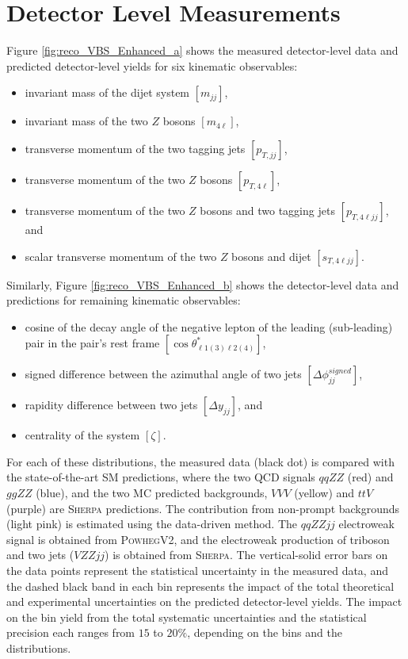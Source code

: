 \section{Detector Level Measurements }
\label{sec:DetectorLevel_Measurement}

Figure \ref{fig:reco_VBS_Enhanced_a} shows the measured detector-level data and predicted detector-level yields for six kinematic observables:
\begin{itemize}
    \item{ invariant mass of the dijet system $[m_{jj}]$},
    \item{ invariant mass of the two $Z$ bosons $[m_{4\ell}]$},
    \item{ transverse momentum of the two tagging jets $[p_{T,jj}]$},
    \item{ transverse momentum of the two $Z$ bosons $[p_{T,4\ell}]$},
    \item{ transverse momentum of the two $Z$ bosons and two tagging jets $[p_{T,4\ell jj}]$}, and 
    \item{ scalar transverse momentum of the two $Z$ bosons and dijet $[s_{T,4\ell jj}]$}.
\end{itemize}
Similarly, Figure \ref{fig:reco_VBS_Enhanced_b} shows the detector-level data and predictions for remaining kinematic observables:
\begin{itemize}
\item{ cosine of the decay angle of the negative lepton of the leading (sub-leading) pair in the pair's rest frame $[\cos \theta^{*}_{\ell 1 (3) \ell 2 (4)}]$},
\item{ signed difference between the azimuthal angle of two jets $[\Delta \phi _{jj}^{signed}]$},
\item{ rapidity difference between two jets $[\Delta y_{jj}]$}, and 
\item{ centrality of the system $[\zeta]$}.
\end{itemize}
For each of these distributions, the measured data (black dot) is compared with the state-of-the-art SM predictions, where the two QCD signals $qqZZ$ (red) and $ggZZ$ (blue), and the two MC predicted backgrounds, $VVV$ (yellow) and $ttV$ (purple) are \textsc{Sherpa} predictions. The contribution from non-prompt backgrounds (light pink) is estimated using the data-driven method. The $qqZZjj$ electroweak signal is obtained from \textsc{PowhegV2}, and the electroweak production of triboson and two jets ($VZZjj$) is obtained from \textsc{Sherpa}. The vertical-solid error bars on the data points represent the statistical uncertainty in the measured data, and the dashed black band in each bin represents the impact of the total theoretical and experimental uncertainties on the predicted detector-level yields. The impact on the bin yield from the total systematic uncertainties and the statistical precision each ranges from $15$ to $20\%$, depending on the bins and the distributions. 

